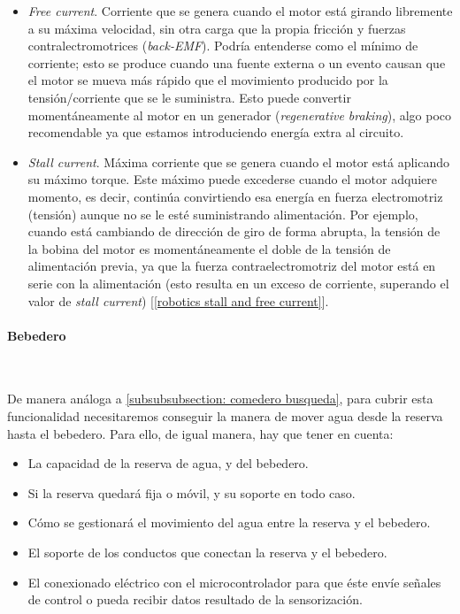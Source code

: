 \documentclass[12pt]{article}
\newcommand{\subsubsubsection}[1]{\paragraph{#1}\mbox{}\\}
\begin{document}
	\begin{itemize}
		\item \textit{Free current}. Corriente que se genera cuando el motor está girando libremente a su máxima velocidad, sin otra carga que la propia fricción y fuerzas contralectromotrices (\textit{back-EMF}). Podría entenderse como el mínimo de corriente; esto se produce cuando una fuente externa o un evento causan que el motor se mueva más rápido que el movimiento producido por la tensión/corriente que se le suministra. Esto puede convertir momentáneamente al motor en un generador (\textit{regenerative braking}), algo poco recomendable ya que estamos introduciendo energía extra al circuito.
		\item \textit{Stall current}. Máxima corriente que se genera cuando el motor está aplicando su máximo torque. Este máximo puede excederse cuando el motor adquiere momento, es decir, continúa convirtiendo esa energía en fuerza electromotriz (tensión) aunque no se le esté suministrando alimentación. Por ejemplo, cuando está cambiando de dirección de giro de forma abrupta, la tensión de la bobina del motor es momentáneamente el doble de la tensión de alimentación previa, ya que la fuerza contraelectromotriz del motor está en serie con la alimentación (esto resulta en un exceso de corriente, superando el valor de \textit{stall current}) [\ref{robotics stall and free current}].
	\end{itemize}

	\pagebreak
	
	\subsubsubsection{Bebedero}
	\label{subsubsubsection: bebedero busqueda soluciones}
	
	\noindent De manera análoga a \ref{subsubsubsection: comedero busqueda}, para cubrir esta funcionalidad necesitaremos conseguir la manera de mover agua desde la reserva hasta el bebedero. Para ello, de igual manera, hay que tener en cuenta: 
	
	\begin{itemize}
		\item La capacidad de la reserva de agua, y del bebedero.
		\item Si la reserva quedará fija o móvil, y su soporte en todo caso.
		\item Cómo se gestionará el movimiento del agua entre la reserva y el bebedero.
		\item El soporte de los conductos que conectan la reserva y el bebedero.
		\item El conexionado eléctrico con el microcontrolador para que éste envíe señales de control o pueda recibir datos resultado de la sensorización.
	\end{itemize}
	
\end{document}
